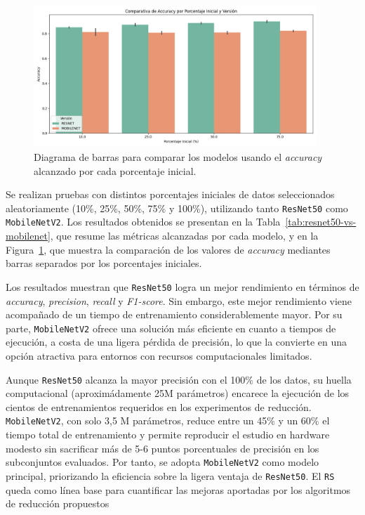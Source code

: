 \begin{figure}[htp]
  \centering
  \includegraphics[width=0.95\textwidth]{imagenes/evaluaciones/comparacion_modelos.png}
  \caption{Diagrama de barras para comparar los modelos usando el \textit{accuracy} alcanzado por cada porcentaje inicial.}
  \label{fig:comparacion_modelos}
\end{figure}

Se realizan pruebas con distintos porcentajes iniciales de datos seleccionados aleatoriamente (10\%, 25\%, 50\%, 75\% y 100\%), utilizando tanto \texttt{ResNet50} como \texttt{MobileNetV2}.
Los resultados obtenidos se presentan en la Tabla~\ref{tab:resnet50-vs-mobilenet}, que resume las métricas alcanzadas por cada modelo,
y en la Figura~\ref{fig:comparacion_modelos}, que muestra la comparación de los valores de \textit{accuracy} mediantes barras separados por los porcentajes iniciales.

Los resultados muestran que \texttt{ResNet50} logra un mejor rendimiento en términos de \textit{accuracy}, \textit{precision}, \textit{recall} y \textit{F1-score}.
Sin embargo, este mejor rendimiento viene acompañado de un tiempo de entrenamiento considerablemente mayor.
Por su parte, \texttt{MobileNetV2} ofrece una solución más eficiente en cuanto a tiempos de ejecución, a costa de una ligera pérdida de precisión,
lo que la convierte en una opción atractiva para entornos con recursos computacionales limitados.

Aunque \texttt{ResNet50} alcanza la mayor precisión con el 100\% de los datos, su huella computacional (aproximádamente 25M parámetros) encarece la ejecución de los cientos de entrenamientos requeridos en los experimentos de reducción.
\texttt{MobileNetV2}, con solo 3,5 M parámetros, reduce entre un 45\% y un 60\% el tiempo total de entrenamiento y
permite reproducir el estudio en hardware modesto sin sacrificar más de 5-6 puntos porcentuales de precisión en los subconjuntos evaluados.
Por tanto, se adopta \texttt{MobileNetV2} como modelo principal, priorizando la eficiencia sobre la ligera ventaja de \texttt{ResNet50}.
El \texttt{RS} queda como línea base para cuantificar las mejoras aportadas por los algoritmos de reducción propuestos

